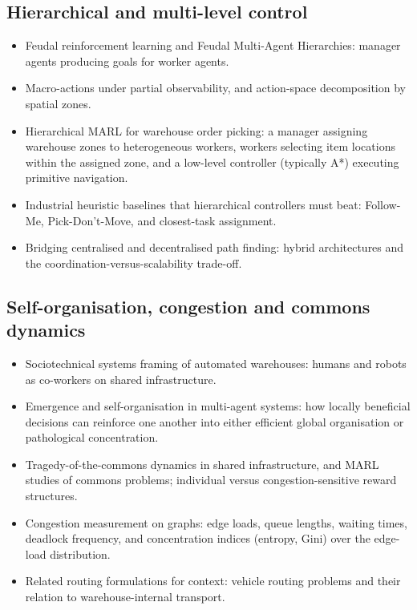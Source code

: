 \subsection{Hierarchical and multi-level control}
\begin{itemize}
  \item Feudal reinforcement learning and Feudal Multi-Agent Hierarchies:
        manager agents producing goals for worker agents.
  \item Macro-actions under partial observability, and action-space
        decomposition by spatial zones.
  \item Hierarchical MARL for warehouse order picking: a manager assigning
        warehouse zones to heterogeneous workers, workers selecting item
        locations within the assigned zone, and a low-level controller
        (typically A*) executing primitive navigation.
  \item Industrial heuristic baselines that hierarchical controllers must
        beat: Follow-Me, Pick-Don't-Move, and closest-task assignment.
  \item Bridging centralised and decentralised path finding: hybrid
        architectures and the coordination-versus-scalability trade-off.
\end{itemize}

\subsection{Self-organisation, congestion and commons dynamics}
\begin{itemize}
  \item Sociotechnical systems framing of automated warehouses: humans and
        robots as co-workers on shared infrastructure.
  \item Emergence and self-organisation in multi-agent systems: how locally
        beneficial decisions can reinforce one another into either efficient
        global organisation or pathological concentration.
  \item Tragedy-of-the-commons dynamics in shared infrastructure, and MARL
        studies of commons problems; individual versus congestion-sensitive
        reward structures.
  \item Congestion measurement on graphs: edge loads, queue lengths, waiting
        times, deadlock frequency, and concentration indices (entropy, Gini)
        over the edge-load distribution.
  \item Related routing formulations for context: vehicle routing problems
        and their relation to warehouse-internal transport.
\end{itemize}
